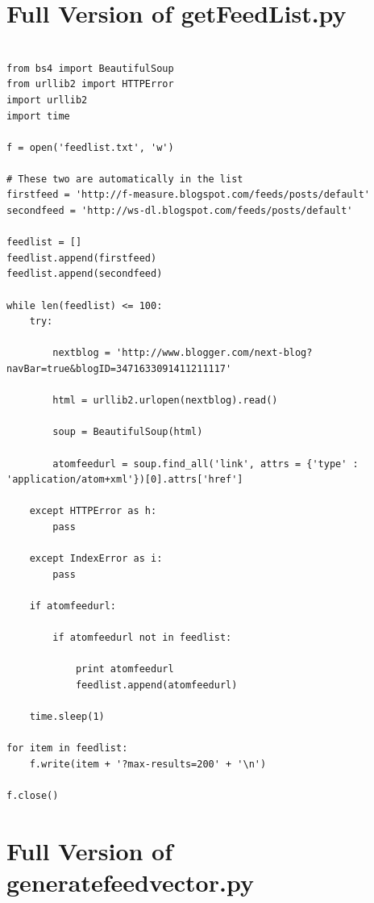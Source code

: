 \documentclass{article}
\begin{document}
\newpage
\appendix

\section{Full Version of getFeedList.py}

\begin{lstlisting}[frame=single, caption=getFeedList.py, label=getFeedList]

from bs4 import BeautifulSoup
from urllib2 import HTTPError
import urllib2
import time

f = open('feedlist.txt', 'w')

# These two are automatically in the list
firstfeed = 'http://f-measure.blogspot.com/feeds/posts/default'
secondfeed = 'http://ws-dl.blogspot.com/feeds/posts/default'

feedlist = []
feedlist.append(firstfeed)
feedlist.append(secondfeed)

while len(feedlist) <= 100:
    try:

        nextblog = 'http://www.blogger.com/next-blog?navBar=true&blogID=3471633091411211117'

        html = urllib2.urlopen(nextblog).read()

        soup = BeautifulSoup(html)

        atomfeedurl = soup.find_all('link', attrs = {'type' : 'application/atom+xml'})[0].attrs['href']

    except HTTPError as h:
        pass

    except IndexError as i:
        pass

    if atomfeedurl:

        if atomfeedurl not in feedlist:

            print atomfeedurl
            feedlist.append(atomfeedurl)

    time.sleep(1)

for item in feedlist:
    f.write(item + '?max-results=200' + '\n')

f.close()

\end{lstlisting}

\section{Full Version of generatefeedvector.py}
\end{document}
